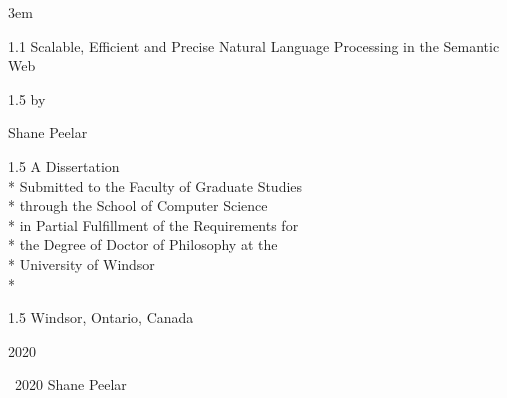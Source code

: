 \documentclass[fleqn, oneside, 12pt]{book}
\author{Shane Peelar}
\title{\dtitle}
\date{\defensedate}
\theoremstyle{definitionsty}
\newcommand{\uwinsinglespacelen}{1.1}
\newcommand{\uwinonehalfspacelen}{1.5}
\newenvironment{uwinsinglespaceenv}%
{\begin{spacing}{\uwinsinglespacelen}}%
	{\end{spacing}}
\newenvironment{uwinonehalfspaceenv}%
{\begin{spacing}{\uwinonehalfspacelen}}%
	{\end{spacing}}
\newcommand{\dtitle}{Scalable, Efficient and Precise Natural Language Processing in the Semantic Web}
\begin{document}
\emergencystretch 3em %

\setlength{\abovedisplayskip}{0pt}
\setlength{\belowdisplayskip}{12pt}
\setlength{\abovedisplayshortskip}{0pt}
\setlength{\belowdisplayshortskip}{0pt}




\clearpage


\thispagestyle{empty}
\begin{center}
	\vspace*{0in}

	\begin{uwinsinglespaceenv}
		\Large{\strong\dtitle}
	\end{uwinsinglespaceenv}

	\vspace{0.125in}
	\begin{uwinonehalfspaceenv}
		by

		Shane Peelar
	\end{uwinonehalfspaceenv}
	\vspace{1.625in}

	\begin{uwinonehalfspaceenv}
	A Dissertation \\*
	Submitted to the Faculty of Graduate Studies \\*
	through the School of Computer Science \\*
	in Partial Fulfillment of the Requirements for \\*
	the Degree of Doctor of Philosophy at the \\*
	University of Windsor \\*
	\end{uwinonehalfspaceenv}

	\vspace{0.625in}
	\begin{uwinonehalfspaceenv}
	Windsor, Ontario, Canada \\

	\vspace{0.5cm}

	2020 \\
	\vspace{0.5cm}

	\textcopyright \  2020 Shane Peelar
	\end{uwinonehalfspaceenv}
\end{center}
\end{document}

